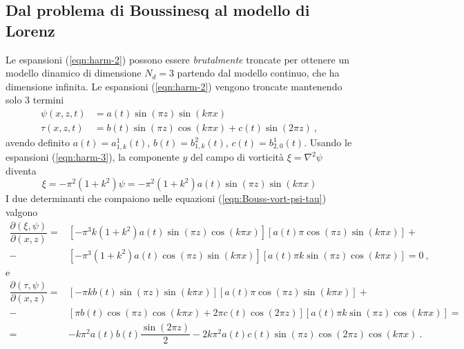 \subsection{Dal problema di Boussinesq al modello di Lorenz}
Le espansioni (\ref{eqn:harm-2}) possono essere \textit{brutalmente} troncate per ottenere un modello dinamico di dimensione $N_d = 3$ partendo dal modello continuo, che ha dimensione infinita. Le espansioni (\ref{eqn:harm-2}) vengono troncate mantenendo solo 3 termini
\begin{equation}\label{eqn:harm-3}
\begin{aligned}
    \psi(x,z,t) & = a(t) \sin{(\pi z)} \sin{(k\pi x )}  \\
    \tau(x,z,t) & = b(t) \sin{(\pi z)} \cos{(k\pi x )} + c(t) \sin{(2 \pi z)}   \ ,
\end{aligned}
\end{equation}
avendo definito $a(t) = a^1_{1,k}(t)$, $b(t) = b^2_{1,k}(t)$, $c(t) = b^1_{2,0}(t)$.
Usando le espansioni (\ref{eqn:harm-3}), la componente $y$ del campo di vorticità $\xi = \nabla^2 \psi$ diventa
\begin{equation}
    \xi = - \pi^2 (1 + k^2) \psi = - \pi^2 (1 + k^2) a(t) \sin{(\pi z)} \sin{(k\pi x )}
\end{equation}
%
I due determinanti che compaiono nelle equazioni (\ref{eqn:Bouss-vort-psi-tau}) valgono
\begin{equation}
\begin{aligned}
     \dfrac{\partial (\xi, \psi)}{\partial (x,z)} = &
     \left[ -\pi^3 k(1+k^2) a(t) \sin{(\pi z)}  \cos{(k \pi x)} \right]
     \left[ a(t) \pi \cos{(\pi z)} \sin{(k \pi x)} \right] + \\
      - & \left[  -\pi^3 (1+k^2) a(t) \cos{(\pi z)}  \sin{(k \pi x)} \right]
      \left[ a(t) \pi k \sin{(\pi z)} \cos{(k \pi x)} \right] = 0 \ ,
\end{aligned}
\end{equation}
e
\begin{equation}
\begin{aligned}
    \dfrac{\partial (\tau, \psi)}{\partial (x,z)} = &
    \left[ - \pi k b(t) \sin{(\pi z )} \sin{(k \pi x)} \right]
    \left[ a(t) \pi \cos{(\pi z)} \sin{(k \pi x)} \right] + \\
    - & \left[ \pi b(t) \cos{(\pi z )} \cos{(k \pi x)} + 2\pi c(t) \cos{(2\pi z)} \right]
    \left[ a(t) \pi k \sin{(\pi z)} \cos{(k \pi x)} \right] = \\
    = & - k \pi^2 a(t) b(t) \dfrac{\sin{( 2 \pi z)}}{2} -
    2 k \pi^2 a(t)c(t) \sin(\pi z) \cos(2\pi z) \cos(k \pi x) \ .
\end{aligned}
\end{equation}

